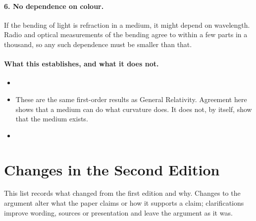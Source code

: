 \documentclass[11pt,a4paper]{article}
\begin{document}
\paragraph{6. No dependence on colour.} If the bending of light is refraction in a medium, it might depend on wavelength. Radio and optical measurements of the bending agree to within a few parts in a thousand, so any such dependence must be smaller than that. 

\paragraph{What this establishes, and what it does not.}
\begin{itemize}
  \item {}
  \item These are the same first-order results as General Relativity. Agreement here shows that a medium can do what curvature does. It does not, by itself, show that the medium exists.
  \item {}
\end{itemize}

\clearpage
\section*{Changes in the Second Edition}

This list records what changed from the first edition and why. Changes to the argument alter what the paper claims or how it supports a claim; clarifications improve wording, sources or presentation and leave the argument as it was.
\end{document}
